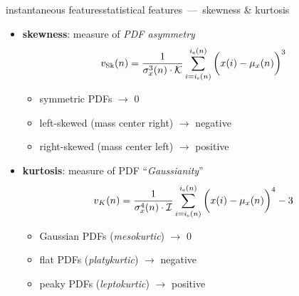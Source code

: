         \begin{frame}{instantaneous features}{statistical features~---~skewness \& kurtosis}
            \begin{itemize}
                \item \textbf{skewness}: measure of \textit{PDF asymmetry}
                    \begin{equation*}
                        v_{\mathrm{Sk}}(n) = {\frac{1}{\sigma_x^3(n)\cdot \mathcal{K}}\sum\limits_{i=i_{\mathrm{s}}(n)}^{i_{\mathrm{e}}(n)}{\left(\vphantom{\frac{1}{1}}x(i)-\mu_x(n)\right)^3}} 
                    \end{equation*}
                    \begin{footnotesize}
                            \begin{itemize}
                                \item<2->	symmetric PDFs $\rightarrow$ $0$
                                \item<2->	left-skewed (mass center right) $\rightarrow$ negative
                                \item<2->	right-skewed (mass center left) $\rightarrow$ positive 
                            \end{itemize}
                    \end{footnotesize}
                \item<3-> \textbf{kurtosis}: measure of PDF ``\textit{Gaussianity}''
                    \begin{equation*}
                        v_{K}(n) = {\frac{1}{\sigma_x^4(n)\cdot \mathcal{I}}\sum\limits_{i=i_{\mathrm{s}}(n)}^{i_{\mathrm{e}}(n)}{\left(\vphantom{\frac{1}{1}}x(i)-\mu_x(n)\right)^4}} - 3 
                    \end{equation*}
                    \begin{footnotesize}
                            \begin{itemize}
                                \item<4->	Gaussian PDFs (\textit{mesokurtic})  $\rightarrow$ 0
                                \item<4->	flat PDFs (\textit{platykurtic}) $\rightarrow$ negative
                                \item<4->	peaky PDFs (\textit{leptokurtic})  $\rightarrow$ positive
                            \end{itemize}	
                    \end{footnotesize}
            \end{itemize}
        \end{frame}
